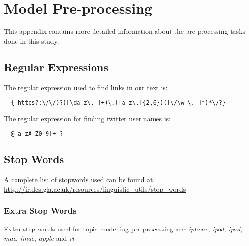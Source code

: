 \chapter{Model Pre-processing}
\label{cha:appx-model-preprocessing}
This appendix contains more detailed information about the pre-processing tasks done in this study.

\section*{Regular Expressions}
\label{sec:appx-regular-expressions}
The regular expression used to find links in our text is:
\begin{verbatim}
  {(https?:\/\/)?([\da-z\.-]+)\.([a-z\.]{2,6})([\/\w \.-]*)*\/?}
\end{verbatim}

The regular expression for finding twitter user names is:
\begin{verbatim}
  @[a-zA-Z0-9]+ ?
\end{verbatim}

\section*{Stop Words}
\label{sec:appx-stopwords}
A complete list of stopwords used can be found at
\url{http://ir.dcs.gla.ac.uk/resources/linguistic_utils/stop_words}

\subsection*{Extra Stop Words}
\label{sec:appx-extra-stopwords}
Extra stop words used for topic modelling pre-processing are: \textit{iphone}, \textit{ipod},
\textit{ipad}, \textit{mac}, \textit{imac}, \textit{apple} and \textit{rt}


